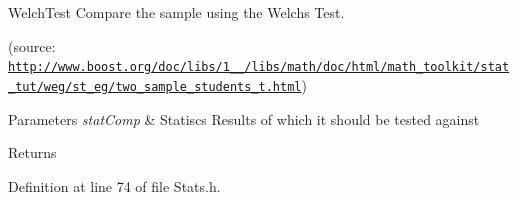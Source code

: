 Welch\+Test Compare the sample using the Welch\textquotesingle{}s Test. 

(source\+: \href{http://www.boost.org/doc/libs/1_57_0/libs/math/doc/html/math_toolkit/stat_tut/weg/st_eg/two_sample_students_t.html}{\tt http\+://www.\+boost.\+org/doc/libs/1\+\_\+\_/libs/math/doc/html/math\+\_\+toolkit/stat\+\_\+tut/weg/st\+\_\+eg/two\+\_\+sample\+\_\+students\+\_\+t.\+html}) 
\begin{DoxyParams}{Parameters}
{\em stat\+Comp} & Statiscs Results of which it should be tested against \\
\hline
\end{DoxyParams}
\begin{DoxyReturn}{Returns}

\end{DoxyReturn}


Definition at line 74 of file Stats.\+h.


